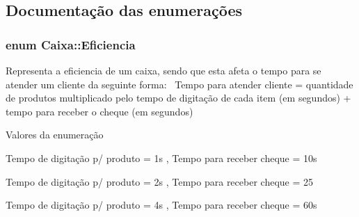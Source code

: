 \subsection{Documentação das enumerações}
\hypertarget{a00001_a0e98d0cd8dc2ff4f73d637d73f7bbe85}{
\subsubsection[{Eficiencia}]{\setlength{\rightskip}{0pt plus 5cm}enum {\bf Caixa\+::\+Eficiencia}}}\label{a00001_a0e98d0cd8dc2ff4f73d637d73f7bbe85}
Representa a eficiencia de um caixa, sendo que esta afeta o tempo para se atender um cliente da seguinte forma\+:~\newline
Tempo para atender cliente = quantidade de produtos multiplicado pelo tempo de digitação de cada item (em segundos) + tempo para receber o cheque (em segundos) \begin{Desc}
\item[Valores da enumeração]\par
\begin{description}
\item[{\em 
\hypertarget{a00001_a0e98d0cd8dc2ff4f73d637d73f7bbe85ac540cf6ebf89599c2551d4b9b03c48d7}{eficiente}\label{a00001_a0e98d0cd8dc2ff4f73d637d73f7bbe85ac540cf6ebf89599c2551d4b9b03c48d7}
}]Tempo de digitação p/ produto = 1s , Tempo para receber cheque = 10s \item[{\em 
\hypertarget{a00001_a0e98d0cd8dc2ff4f73d637d73f7bbe85a44121dbf9c403365d0a090127e43a499}{medio}\label{a00001_a0e98d0cd8dc2ff4f73d637d73f7bbe85a44121dbf9c403365d0a090127e43a499}
}]Tempo de digitação p/ produto = 2s , Tempo para receber cheque = 25 \item[{\em 
\hypertarget{a00001_a0e98d0cd8dc2ff4f73d637d73f7bbe85ad22f3ab5e25a4b9e6c8f534a88a04c7a}{ruim}\label{a00001_a0e98d0cd8dc2ff4f73d637d73f7bbe85ad22f3ab5e25a4b9e6c8f534a88a04c7a}
}]Tempo de digitação p/ produto = 4s , Tempo para receber cheque = 60s \end{description}
\end{Desc}


